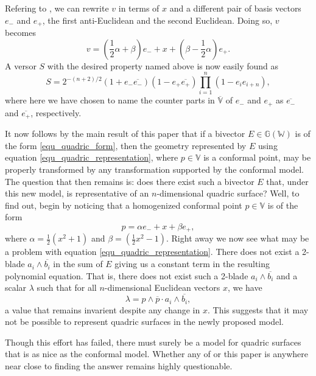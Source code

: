 \documentclass{birkjour}
\theoremstyle{definition}
\theoremstyle{remark}
\numberwithin{equation}{section}
\newcommand{\G}{\mathbb{G}}
\newcommand{\V}{\mathbb{V}}
\newcommand{\W}{\mathbb{W}}
\begin{document}
Refering to \cite{LiRockwood},
we can rewrite $v$ in terms of $x$ and a different pair of basis vectors $e_{-}$ and $e_{+}$,
the first anti-Euclidean and the second Euclidean.  Doing so, $v$ becomes
\begin{equation}
v = \left(\frac{1}{2}\alpha + \beta\right)e_{-} + x + \left(\beta - \frac{1}{2}\alpha\right)e_{+}.
\end{equation}
A versor $S$ with the desired property named above is now easily found as
\begin{equation}
S = 2^{-(n+2)/2}(1+e_{-}\overline{e_{-}})(1-e_{+}\overline{e_{+}})\prod_{i=1}^n(1-e_ie_{i+n}),
\end{equation}
where here we have chosen to name the counter parts in $\overline{\V}$ of $e_{-}$ and $e_{+}$
as $\overline{e_{-}}$ and $\overline{e_{+}}$, respectively.

It now follows by the main result of this paper that if a bivector $E\in\G(\W)$
is of the form \eqref{equ_quadric_form}, then the geometry represented
by $E$ using equation \eqref{equ_quadric_representation}, where $p\in\V$ is a conformal point,
may be properly transformed by any transformation supported by the conformal model.
The question that then remains is: does there exist such a bivector $E$ that,
under this new model, is representative of an $n$-dimensional quadric surface?
Well, to find out, begin by noticing that a homogenized conformal point $p\in\V$ is of the form
\begin{equation}
p = \alpha e_{-} + x + \beta e_{+},
\end{equation}
where $\alpha=\frac{1}{2}(x^2+1)$ and $\beta=(\frac{1}{2}x^2-1)$.
Right away we now see what may be a problem with equation \eqref{equ_quadric_representation}.
There does not exist a 2-blade $a_i\wedge\overline{b_i}$ in the sum of $E$ giving
us a constant term in the resulting polynomial equation.  That is, there does not
exist such a 2-blade $a_i\wedge\overline{b_i}$ and a scalar $\lambda$ such that for
all $n$-dimensional Euclidean vectors $x$, we have
\begin{equation}
\lambda=p\wedge\overline{p}\cdot a_i\wedge\overline{b_i},
\end{equation}
a value that remains invarient despite any change in $x$.  This suggests that
it may not be possible to represent quadric surfaces in the newly proposed model.

Though this effort has failed, there must surely be a model for quadric surfaces
that is as nice as the conformal model.  Whether any of \cite{Parkin12} or
this paper is anywhere near close to finding the answer remains highly questionable.




\end{document}
